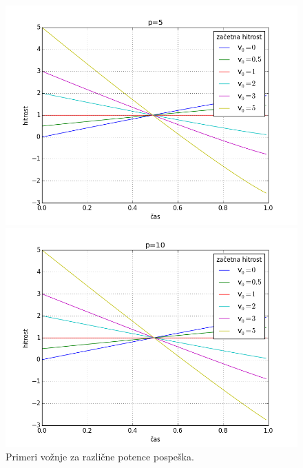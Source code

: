 \documentclass[11pt]{article}
\numberwithin{equation}{section} %
\numberwithin{table}{section} %
\begin{document}
\begin{figure}[t]
{\begin{minipage}[t]{0.5\paperwidth}
\begin{flushleft}

\includegraphics[scale=0.5]{slike/drugap=5.png}
\hspace{\fill}
\end{flushleft}
\end{minipage}
\begin{minipage}[t]{0.5\paperwidth}
\includegraphics[scale=0.5]{slike/drugap=10.png}
\end{minipage}%
}
\caption{Primeri vožnje za različne potence pospeška.}
\end{figure}
\end{document}
